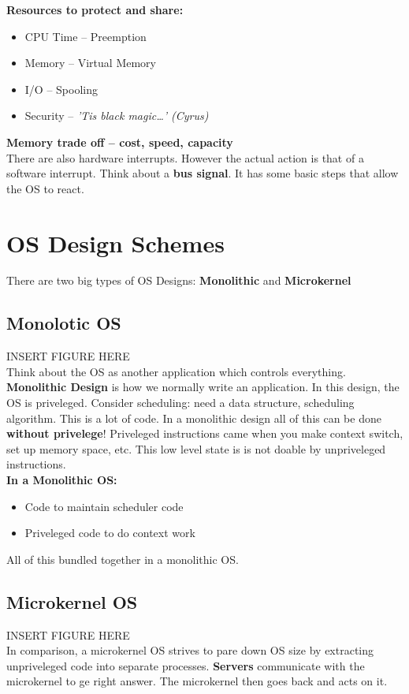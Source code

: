 \documentclass[../base_file/cs1550_notes.tex]{subfiles}
\begin{document}
\textbf{Resources to protect and share:}
	\begin{itemize}
	\item CPU Time -- Preemption
	\item Memory -- Virtual Memory
	\item I/O -- Spooling
	\item Security -- \textit{'Tis black magic\ldots' (Cyrus)}
	\end{itemize}
\textbf{Memory trade off -- cost, speed, capacity}\\

There are also hardware interrupts.  However the actual action is that of a software interrupt.  Think
about a \textbf{bus signal}.  It has some basic steps that allow the OS to react.

\section{OS Design Schemes}
There are two big types of OS Designs: \textbf{Monolithic} and \textbf{Microkernel}

\subsection{Monolotic OS}
INSERT FIGURE HERE\\
Think about the OS as another application which controls everything.  \textbf{Monolithic Design} is how
we normally write an application.  In this design, the OS is priveleged.  Consider scheduling: need a 
data structure, scheduling algorithm.  This is a lot of code.  In a monolithic design all of this can
be done \textbf{without privelege}!  Priveleged instructions came when you make context switch, set up
memory space, etc. This low level state is is not doable by unpriveleged instructions.\\

\textbf{In a Monolithic OS:}
	\begin{itemize}
	\item Code to maintain scheduler code
	\item Priveleged code to do context work
	\end{itemize}
All of this bundled together in a monolithic OS.

\subsection{Microkernel OS}
INSERT FIGURE HERE\\
In comparison, a microkernel OS strives to pare down OS size by extracting unpriveleged code into separate
processes.  \textbf{Servers} communicate with the microkernel to ge right answer.  The microkernel then
goes back and acts on it.
\end{document}
